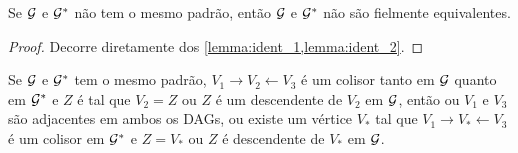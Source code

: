 \begin{lemma}
 \label{lemma:fiel_equiv_1}
 Se ${\mathcal G}$ e ${\mathcal G}^*$ não tem o mesmo padrão, então
 ${\mathcal G}$ e ${\mathcal G}^*$ não são fielmente equivalentes.
\end{lemma}

\begin{proof}
 Decorre diretamente dos \cref{lemma:ident_1,lemma:ident_2}.
\end{proof}

\begin{lemma}
 \label{lemma:colisor_fiel}
 Se ${\mathcal G}$ e ${\mathcal G}^*$ tem o mesmo padrão,
 $V_1 \rightarrow V_2 \leftarrow V_3$ é um colisor
 tanto em ${\mathcal G}$ quanto em ${\mathcal G}^*$ e
 $Z$ é tal que $V_2 = Z$ ou 
 $Z$ é um descendente de $V_2$ em ${\mathcal G}$, então
 ou $V_1$ e $V_3$ são adjacentes em ambos os DAGs,
 ou existe um vértice $V_*$ tal que
 $V_1 \rightarrow V_* \leftarrow V_3$ é
 um colisor em ${\mathcal G}^*$ e
 $Z = V_*$ ou $Z$ é descendente de $V_*$ em ${\mathcal G}$.
\end{lemma}

